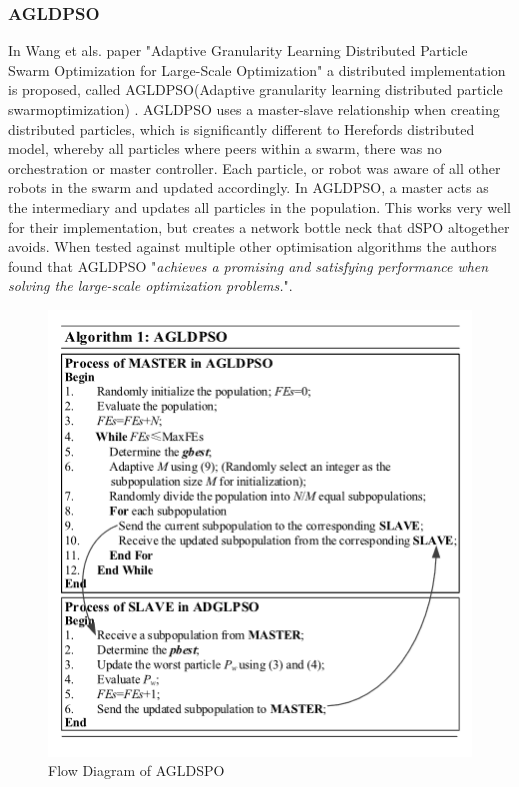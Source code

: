 \documentclass[oneside,12pt]{book}
\begin{document}
\subsubsection{AGLDPSO}
In Wang et als. paper "Adaptive Granularity Learning Distributed Particle Swarm Optimization for Large-Scale Optimization" a distributed implementation is proposed, called AGLDPSO(Adaptive granularity learning distributed particle swarmoptimization) \cite{wang2020adaptive}. AGLDPSO uses a master-slave relationship when creating distributed particles, which is significantly different to Herefords distributed model, whereby all particles where peers within a swarm, there was no orchestration or master controller. Each particle, or robot was aware of all other robots in the swarm and updated accordingly. In AGLDPSO, a master acts as the intermediary and updates all particles in the population. This works very well for their implementation, but creates a network bottle neck that dSPO altogether avoids. When tested against multiple other optimisation algorithms the authors found that AGLDPSO "\textit{achieves a promising and satisfying performance when solving the large-scale optimization problems.}". 
\begin{figure}[H]
    \centering
    \includegraphics[scale=0.8]{Images/AGLDPSO.png}
    \caption{Flow Diagram of AGLDSPO \protect\cite{wang2020adaptive} }
    \label{fig:Flow Diagram of AGLDSPO}
\end{figure}
\end{document}
